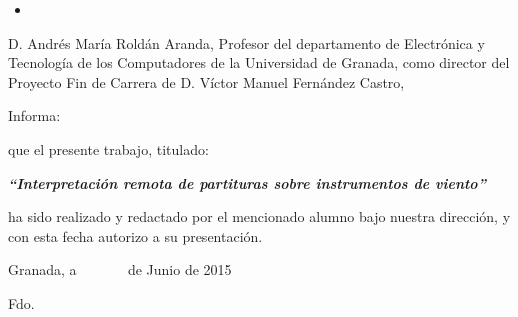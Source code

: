 \begin{itemize}
	\item [] 
\end{itemize}


\newpage


\newpage
\thispagestyle{empty}

\cleardoublepage
\thispagestyle{empty}
{}

\noindent D. Andrés María Roldán Aranda, Profesor del departamento
de Electrónica y Tecnología de los Computadores de la Universidad
de Granada, como director del Proyecto Fin de Carrera de D. Víctor Manuel Fernández Castro,

\vspace*{1cm}

Informa:

\begin{doublespace}
que el presente trabajo, titulado:
\end{doublespace}

\begin{doublespace}
\begin{center}
\textbf{\emph{\large {}``Interpretación remota de partituras sobre instrumentos de viento''}}
\par\end{center}{\large \par}
\end{doublespace}

\noindent ha sido realizado y redactado por el mencionado alumno bajo
nuestra dirección, y con esta fecha autorizo a su presentación. 

\vspace*{1cm}

\begin{center}
Granada, a ~~~~~~ de Junio de 2015
\par\end{center}

\bigskip%
\bigskip%
\begin{doublespace}
\hspace{4cm}Fdo.
\end{doublespace}

\newpage
\thispagestyle{empty}
\noindent

\newpage
\thispagestyle{empty}

